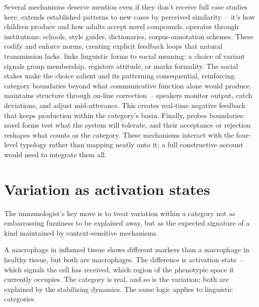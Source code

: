 Several mechanisms deserve mention even if they don't receive full case studies here.  extends established patterns to new cases by perceived similarity~-- it's how children produce  and how adults accept novel compounds.  operates through institutions: schools, style guides, dictionaries, corpus-annotation schemes. These codify and enforce norms, creating explicit feedback loops that natural transmission lacks.  links linguistic forms to social meaning: a choice of variant signals group membership, registers attitude, or marks formality. The social stakes make the choice salient and its patterning consequential, reinforcing category boundaries beyond what communicative function alone would produce.  maintains structure through on-line correction~-- speakers monitor output, catch deviations, and adjust mid-utterance. This creates real-time negative feedback that keeps production within the category's basin. Finally,  probes boundaries: novel forms test what the system will tolerate, and their acceptance or rejection reshapes what counts as the category. These mechanisms interact with the four-level typology rather than mapping neatly onto it; a full constructive account would need to integrate them all.


\section{Variation as activation states}
\label{sec:6:variation-activation-states}

The immunologist's key move is to treat variation within a category not as embarrassing fuzziness to be explained away, but as the expected signature of a kind maintained by context-sensitive mechanisms.

A macrophage in inflamed tissue shows different markers than a macrophage in healthy tissue, but both are macrophages. The difference is activation state~-- which signals the cell has received, which region of the phenotypic space it currently occupies. The category is real, and so is the variation; both are explained by the stabilizing dynamics. The same logic applies to linguistic categories.

